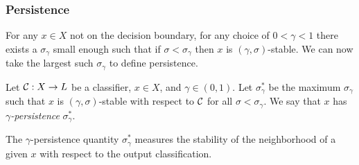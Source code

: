 \begin{frame}
  \frametitle{Persistence}
  
  For any $x\in X$ not on the decision boundary, for any choice of $0<\gamma<1$ there exists a $\sigma_\gamma$ small enough such that if $\sigma < \sigma_\gamma$ then $x$ is $(\gamma,\sigma)$-stable. We can now take the largest such $\sigma_\gamma$ to define persistence.

 \begin{definition}
     Let $\mathcal{C}:X\to L$ be a classifier, $x \in X$, and $\gamma\in(0,1)$. Let $\sigma_\gamma^*$ be the maximum $\sigma_\gamma$ such that $x$ is $(\gamma, \sigma)$-stable with respect to $\mathcal{C}$ for all $\sigma<\sigma_\gamma$. We say that $x$ has \emph{$\gamma$-persistence} $\sigma_\gamma^*$.
 \end{definition}

The $\gamma$-persistence quantity $\sigma_\gamma^*$ measures the
stability of the neighborhood of a given $x$ with respect to the
output classification.
\end{frame}




